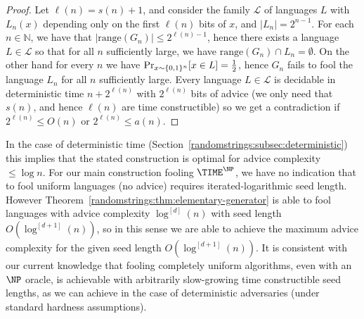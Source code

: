 \begin{proof}

Let $\ell(n)= s(n) + 1$, and consider the family $\mathcal{L}$ of languages $L$ with $L_n(x)$ depending only on the first $\ell(n)$ bits of $x$, and $|L_n| = 2^{n-1}$. 
For each $n \in \mathbb{N}$, we have that $|\mathrm{range}(G_n)| \leq 2^{\ell(n)-1}$, hence there exists a language $L \in \mathcal{L}$ so that for all $n$ sufficiently large, we have $\mathrm{range}(G_n) \cap L_n = \emptyset$. On the other hand for every $n$ we have $\Pr_{x \sim \{0,1\}^n}[x \in L] = \frac{1}{2}$, hence $G_n$ fails to fool the language $L_n$ for all $n$ sufficiently large. Every language $L \in \mathcal{L}$ is decidable in deterministic time $n + 2^{\ell(n)}$ with $2^{\ell(n)}$ bits of advice (we only need that $s(n)$, and hence $\ell(n)$ are time constructible) so we get a contradiction if $2^{\ell(n)} \leq O(n)$ or $2^{\ell(n)} \leq a(n)$.
\end{proof}

In the case of deterministic time (Section~\ref{randomstrings:subsec:deterministic}) this implies that the stated construction is optimal for advice complexity $\leq \log n$. For our main construction fooling $\TIME^{\NP}$, we have no indication that to fool uniform languages (no advice) requires iterated-logarithmic seed length. However Theorem~\ref{randomstrings:thm:elementary-generator} is able to fool languages with advice complexity $\log^{[d]}(n)$ with seed length $O(\log^{[d+1]}(n))$, so in this sense we are able to achieve the maximum advice complexity for the given seed length $O(\log^{[d+1]}(n))$. It is consistent with our current knowledge that fooling completely uniform algorithms, even with an $\NP$ oracle, is achievable with arbitrarily slow-growing time constructible seed lengths, as we can achieve in the case of deterministic adversaries (under standard hardness assumptions).
